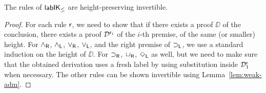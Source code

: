 	\begin{lemma}
		\label{lem:inv}
		The rules of $\mathsf{lab}\mathsf{IK}_{\le}$ are height-preserving invertible. 
	\end{lemma}

	\begin{proof}
		For each rule $\mathsf{r}$, we need to show that if there exists a proof $\DD$ of the conclusion, there exists a proof $\mathcal{D}^{\mathsf{r}_i}$ of the $i$-th premise, of the same (or smaller) height.
		For $\mathsf{\mathbin{\wedge}}_{\mathsf{R}}$, $\mathsf{\mathbin{\wedge}}_{\mathsf{L}}$, $\mathsf{\mathbin{\vee}}_{\mathsf{R}}$, $\mathsf{\mathbin{\vee}}_{\mathsf{L}}$, and the right premise of $\mathsf{\mathbin{\supset}}_{\mathsf{L}}$, we use a standard induction on the height of $\DD$.
		For $\mathsf{\mathbin{\supset}}_{\mathsf{R}}$, $\mathsf{\mathord{\Box}}_{\mathsf{R}}$, $\mathsf{\mathord{\Diamond}}_{\mathsf{L}}$ as well, but
		we need to make sure that the obtained derivation uses a fresh label by using substitution inside $\mathcal{D}^{\mathsf{r}}_1$ when necessary.
		The other rules can be shown invertible using Lemma~\ref{lem:weak-adm}. 
%		
		

\end{proof}
